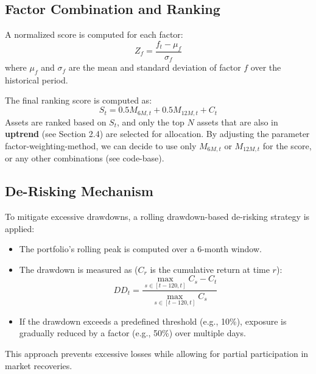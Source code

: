 \documentclass[11pt, oneside, a4paper, titlepage]{report}
\begin{document}
\subsection{Factor Combination and Ranking}
A normalized score is computed for each factor:
\begin{equation}
    Z_f = \frac{f_t - \mu_f}{\sigma_f}
\end{equation}
where $\mu_f$ and $\sigma_f$ are the mean and standard deviation of factor $f$ over the historical period.

The final ranking score is computed as:
\begin{equation}
    S_t = 0.5 M_{6M,t} + 0.5 M_{12M,t} + C_t
\end{equation}
Assets are ranked based on $S_t$, and only the top $N$ assets that are also in \textbf{uptrend} (see Section 2.4) are selected for allocation. By adjusting the parameter factor-weighting-method, we can decide to use only  $M_{6M,t}$ or $M_{12M,t}$ for the score, or any other combinations (see code-base).

\subsection{De-Risking Mechanism}
To mitigate excessive drawdowns, a rolling drawdown-based de-risking strategy is applied:
\begin{itemize}
    \item The portfolio’s rolling peak is computed over a 6-month window.
    \item The drawdown is measured as ($C_r$ is the cumulative return at time $r$):
    \begin{equation}
        DD_t = \frac{\max_{s \in [t-120,t]} C_s - C_t}{\max_{s \in [t-120,t]} C_s}
    \end{equation}
    \item If the drawdown exceeds a predefined threshold (e.g., 10\%), exposure is gradually reduced by a factor (e.g., 50\%) over multiple days.
\end{itemize}
This approach prevents excessive losses while allowing for partial participation in market recoveries.
\end{document}

